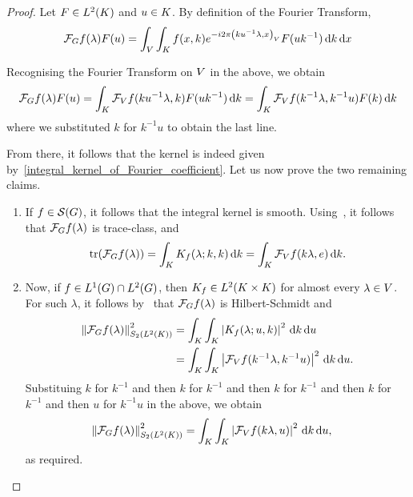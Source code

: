 \begin{proof}
    Let $F \in \Lebesgue{2}\CompactGroup$ and $u \in \CompactGroup$.
    By definition of the Fourier Transform,
    \begin{align*}
        \Fourier f(\lambda) F(u) =
        \int_\VectorSpace
            \int_\CompactGroup
                f(x, k) \e^{-\i \turn \ip{k u^{-1} \lambda}{x}} F(u k^{-1})
            \dd k
        \dd x
    \end{align*}

    Recognising the Fourier Transform on $\VectorSpace$ in the above, we obtain
    \begin{align*}
        \Fourier f(\lambda) F(u) =
        \int_\CompactGroup
            \Fourier[\VectorSpace] f(k u^{-1} \lambda, k) F(u k^{-1})
        \dd k
        =
        \int_\CompactGroup
            \Fourier[\VectorSpace] f(k^{-1} \lambda, k^{-1} u) F(k)
        \dd k
    \end{align*}
    where we substituted $k$ for $k^{-1} u$ to obtain the last line.

    From there, it follows that the kernel is indeed given by~\eqref{integral_kernel_of_Fourier_coefficient}.
    Let us now prove the two remaining claims.

    \begin{enumerate}
        \item If $f \in \Schwartz\Group$, it follows that the integral kernel is smooth.
            Using~\cite[Corollary 4.1]{DelgadoRuzhansky14}, it follows that $\Fourier f(\lambda)$ is trace-class, and
            \begin{align*}
            \tr(\Fourier f(\lambda))
            = \int_\CompactGroup K_f(\lambda; k, k) \dd k
            = \int_\CompactGroup \Fourier[\VectorSpace] f(k \lambda, e) \dd k.
        \end{align*}
    \item Now, if $f \in \Lebesgue{1}\Group \cap \Lebesgue{2}\Group$,
        then $K_{f} \in \Lebesgue{2}{\CompactGroup \times \CompactGroup}$ for almost every $\lambda \in \VectorSpace$.
        For such $\lambda$, it follows by~\cite[Theorem VI.23]{Reed72} that $\Fourier f(\lambda)$ is Hilbert-Schmidt and
        \begin{align*}
            \norm[\SchattenClasses{2}{\Lebesgue{2}\CompactGroup}]{\Fourier f(\lambda)}^2
            &= \int_\CompactGroup \int_\CompactGroup \abs{K_f(\lambda; u, k)}^2 \dd k \dd u\\
            &= \int_\CompactGroup \int_\CompactGroup \abs{\Fourier[\VectorSpace] f(k^{-1} \lambda, k^{-1} u)}^2 \dd k \dd u.
        \end{align*}
        Substituing $k$ for $k^{-1}$ and then $k$ for $k^{-1}$ and then $k$ for $k^{-1}$ and then $k$ for $k^{-1}$ and then $u$ for $k^{-1} u$ in the above, we obtain
        \begin{align*}
            \norm[\SchattenClasses{2}{\Lebesgue{2}\CompactGroup}]{\Fourier f(\lambda)}^2
            &= \int_\CompactGroup \int_\CompactGroup \abs{\Fourier[\VectorSpace] f(k \lambda, u)}^2 \dd k \dd u,
        \end{align*}
        as required.
    \end{enumerate}
\end{proof}

